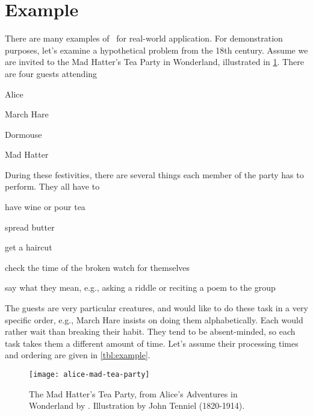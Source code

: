\section{Example}\label{sec:jsp:example}
There are many examples of \jsp\ for real-world application. 
For demonstration purposes, let's examine a hypothetical problem from 
the 18th century. Assume we are invited to the Mad Hatter's Tea Party in 
Wonderland, illustrated in \cref{fig:teaparty}. 
There are four guests attending
\begin{enumerate*}[label={$J_\arabic*$)}, ref={{$J_\arabic*$}}, 
    itemjoin*={{, and of course our host }}]
    \item Alice\label{guest:alice}
    \item March Hare\label{guest:marchhare}
    \item Dormouse\label{guest:dormouse}
    \item Mad Hatter\label{guest:madhatter}
\end{enumerate*}
During these festivities, there are several things each member of the party 
has to perform. They all have to
\begin{enumerate*}[label={$M_\arabic*$)}]
    \item have wine or pour tea
    \item spread butter
    \item get a haircut
    \item check the time of the broken watch for themselves
    \item say what they mean, e.g., asking a riddle  or reciting a poem to the 
    group
\end{enumerate*}
The guests are very particular creatures, and would like to do these task in a 
very specific order, e.g., March Hare insists on doing 
them alphabetically. Each would rather wait than breaking their habit.
They tend to be absent-minded, so each task takes them a different amount of 
time. 
Let's assume their processing times and ordering are given in 
\cref{tbl:example}. 


\begin{figure}[b!]\centering 
    \texttt{[image: alice-mad-tea-party]}
    \caption[The Mad Hatter's Tea Party]{The Mad Hatter's Tea
        Party, from Alice's Adventures in Wonderland by \citet{alice}. 
        Illustration by John Tenniel (1820-1914).}\label{fig:teaparty}
\end{figure}



